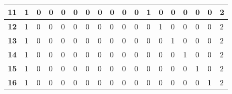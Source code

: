 \begin{center}
\begin{longtable}{|P{0.3cm}|P{0.3cm}|P{0.3cm}|P{0.3cm}|P{0.3cm}|P{0.3cm}|P{0.3cm}|P{0.3cm}|P{0.3cm}|P{0.3cm}|P{0.3cm}|P{0.3cm}|P{0.3cm}|P{0.3cm}|P{0.3cm}|P{0.3cm}|P{0.3cm}|P{1.4cm}|}
\textbf{11}                        & 1                     & 0                     & 0                     & 0                     & 0                     & 0                     & 0                     & 0                     & 0                     & 0                     & 1                     & 0                     & 0                     & 0                     & 0                     & 0                     & 2                     \\ \hline
\textbf{12}                        & 1                     & 0                     & 0                     & 0                     & 0                     & 0                     & 0                     & 0                     & 0                     & 0                     & 0                     & 1                     & 0                     & 0                     & 0                     & 0                     & 2                     \\ \hline
\textbf{13}                        & 1                     & 0                     & 0                     & 0                     & 0                     & 0                     & 0                     & 0                     & 0                     & 0                     & 0                     & 0                     & 1                     & 0                     & 0                     & 0                     & 2                     \\ \hline
\textbf{14}                        & 1                     & 0                     & 0                     & 0                     & 0                     & 0                     & 0                     & 0                     & 0                     & 0                     & 0                     & 0                     & 0                     & 1                     & 0                     & 0                     & 2                     \\ \hline
\textbf{15}                        & 1                     & 0                     & 0                     & 0                     & 0                     & 0                     & 0                     & 0                     & 0                     & 0                     & 0                     & 0                     & 0                     & 0                     & 1                     & 0                     & 2                     \\ \hline
\textbf{16}                        & 1                     & 0                     & 0                     & 0                     & 0                     & 0                     & 0                     & 0                     & 0                     & 0                     & 0                     & 0                     & 0                     & 0                     & 0                     & 1                     & 2                     \\ \hline

\end{longtable}
\end{center}
